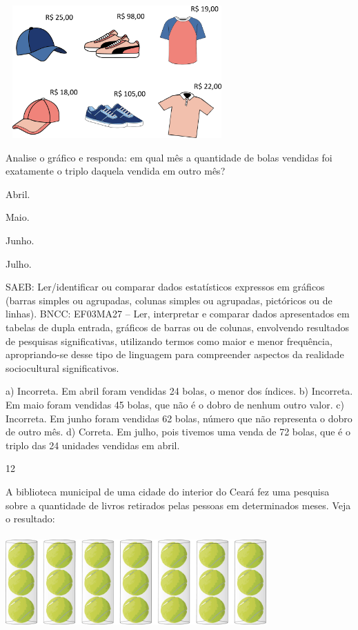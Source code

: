 \begin{multicols}{2}
\begin{enumerate}
{%

\includegraphics[width=3.36538in,height=2.00040in]{media/image120.png}

Analise o gráfico e responda: em qual mês a quantidade de bolas vendidas foi exatamente o triplo daquela vendida em outro mês?

\begin{escolha}
\item
  Abril.
\item
  Maio.
\item
  Junho.
\item
  Julho.
\end{escolha}

SAEB: Ler/identificar ou comparar dados estatísticos
expressos em gráficos (barras simples ou agrupadas, colunas simples ou agrupadas, pictóricos ou de linhas).
BNCC: EF03MA27 -- Ler, interpretar e comparar dados apresentados em tabelas de dupla entrada,
gráficos de barras ou de colunas, envolvendo resultados de pesquisas significativas, utilizando
termos como maior e menor frequência, apropriando-se desse tipo de linguagem para compreender aspectos da realidade sociocultural significativos.

a) Incorreta. Em abril foram vendidas 24 bolas, o menor dos índices.
b) Incorreta. Em maio foram vendidas 45 bolas, que não é o dobro de nenhum outro valor.
c) Incorreta. Em junho foram vendidas 62 bolas, número que não representa o dobro de outro mês.
d) Correta. Em julho, pois tivemos uma venda de 72 bolas, que é o triplo das 24 unidades vendidas em abril.

\num{12}

A biblioteca municipal de uma cidade do interior do Ceará fez uma pesquisa sobre a quantidade de livros retirados pelas pessoas em determinados meses. Veja o resultado:


\includegraphics[width=3.93590in,height=1.40906in]{media/image121.png}

}
\end{enumerate}
\end{multicols}
